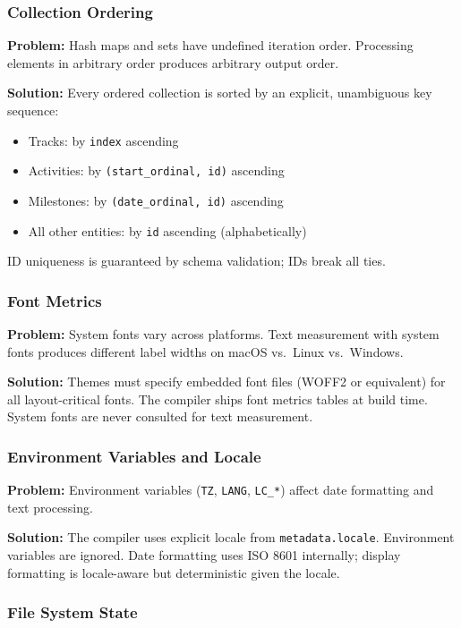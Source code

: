 \subsubsection{Collection Ordering}

\textbf{Problem:} Hash maps and sets have undefined iteration order. Processing elements in arbitrary order produces arbitrary output order.

\textbf{Solution:} Every ordered collection is sorted by an explicit, unambiguous key sequence:
\begin{itemize}
  \item Tracks: by \texttt{index} ascending
  \item Activities: by \texttt{(start\_ordinal, id)} ascending
  \item Milestones: by \texttt{(date\_ordinal, id)} ascending
  \item All other entities: by \texttt{id} ascending (alphabetically)
\end{itemize}
ID uniqueness is guaranteed by schema validation; IDs break all ties.

\subsubsection{Font Metrics}

\textbf{Problem:} System fonts vary across platforms. Text measurement with system fonts produces different label widths on macOS vs.\ Linux vs.\ Windows.

\textbf{Solution:} Themes must specify embedded font files (WOFF2 or equivalent) for all layout-critical fonts. The compiler ships font metrics tables at build time. System fonts are never consulted for text measurement.

\subsubsection{Environment Variables and Locale}

\textbf{Problem:} Environment variables (\texttt{TZ}, \texttt{LANG}, \texttt{LC\_*}) affect date formatting and text processing.

\textbf{Solution:} The compiler uses explicit locale from \texttt{metadata.locale}. Environment variables are ignored. Date formatting uses ISO 8601 internally; display formatting is locale-aware but deterministic given the locale.

\subsubsection{File System State}

